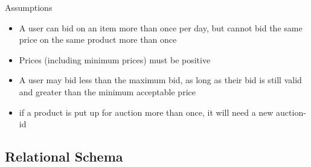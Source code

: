\documentclass[a4paper]{article}
\begin{document}
\noindent
Assumptions
\begin{itemize}
    \item A user can bid on an item more than once per day, but cannot bid the same price on the same product more than once
    \item Prices (including minimum prices) must be positive
    \item A user may bid less than the maximum bid, as long as their bid is still valid and greater than the minimum acceptable price
    \item if a product is put up for auction more than once, it will need a new auction-id
\end{itemize}

\subsection{Relational Schema}
\end{document}
